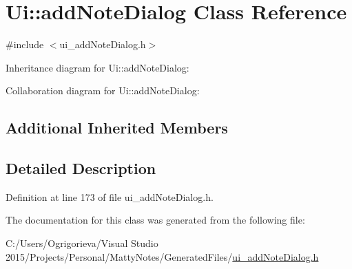 \hypertarget{classUi_1_1addNoteDialog}{}\section{Ui\+:\+:add\+Note\+Dialog Class Reference}
\label{classUi_1_1addNoteDialog}


{\ttfamily \#include $<$ui\+\_\+add\+Note\+Dialog.\+h$>$}



Inheritance diagram for Ui\+:\+:add\+Note\+Dialog\+:


Collaboration diagram for Ui\+:\+:add\+Note\+Dialog\+:
\subsection*{Additional Inherited Members}


\subsection{Detailed Description}


Definition at line 173 of file ui\+\_\+add\+Note\+Dialog.\+h.



The documentation for this class was generated from the following file\+:\begin{DoxyCompactItemize}
\item 
C\+:/\+Users/\+Ogrigorieva/\+Visual Studio 2015/\+Projects/\+Personal/\+Matty\+Notes/\+Generated\+Files/\hyperlink{ui__addNoteDialog_8h}{ui\+\_\+add\+Note\+Dialog.\+h}\end{DoxyCompactItemize}

